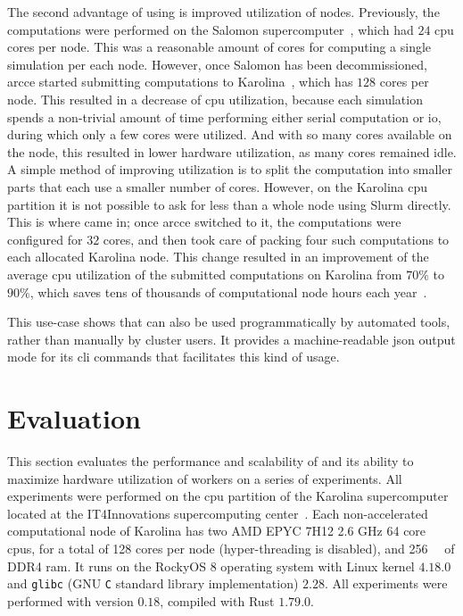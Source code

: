 The second advantage of using \hyperqueue{} is improved utilization of nodes. Previously,
the computations were performed on the Salomon supercomputer~\cite{salomon}, which had
$24$ \gls{cpu} cores per node. This was a reasonable amount of
cores for computing a single simulation per each node. However, once Salomon has been
decommissioned, \gls{arcce} started submitting computations to
Karolina~\cite{karolina}, which has $128$ cores per node. This resulted in
a decrease of \gls{cpu} utilization, because each simulation spends a non-trivial
amount of time performing either serial computation or \gls{io}, during which only a
few cores were utilized. And with so many cores available on the node, this resulted in lower
hardware utilization, as many cores remained idle. A simple method of improving utilization is to
split the computation into smaller parts that each use a smaller number of cores. However, on the
Karolina \gls{cpu} partition it is not possible to ask for less than a whole node
using Slurm directly. This is where \hyperqueue{} came in; once \gls{arcce}
switched to it, the computations were configured for $32$ cores, and
\hyperqueue{} then took care of packing four such computations to each allocated Karolina
node. This change resulted in an improvement of the average \gls{cpu} utilization of
the submitted computations on Karolina from $70\%$ to $90\%$, which
saves tens of thousands of computational node hours each year~\cite{cern-hq}.

This use-case shows that \hyperqueue{} can also be used programmatically by automated
tools, rather than manually by cluster users. It provides a machine-readable
\gls{json} output mode for its \gls{cli} commands that facilitates this
kind of usage.

\section{Evaluation}
\label{hq:evaluation}
This section evaluates the performance and scalability of \hyperqueue{} and its ability
to maximize hardware utilization of workers on a series of experiments. All experiments were
performed on the \gls{cpu} partition of the Karolina
supercomputer~\cite{karolina} located at the IT4Innovations supercomputing
center~\cite{it4i}. Each non-accelerated computational node of Karolina has two AMD
EPYC\texttrademark{} 7H12 2.6 GHz 64 core \glspl{cpu}, for a total of 128 cores
per node (hyper-threading is disabled), and \SI{256}{\gibi\byte} of DDR4
\gls{ram}. It runs on the RockyOS 8 operating system with Linux kernel
$4.18.0$ and \texttt{glibc} (GNU \texttt{C} standard library implementation) $2.28$. All experiments were
performed with \hyperqueue{} version $0.18$, compiled with Rust
$1.79.0$.

